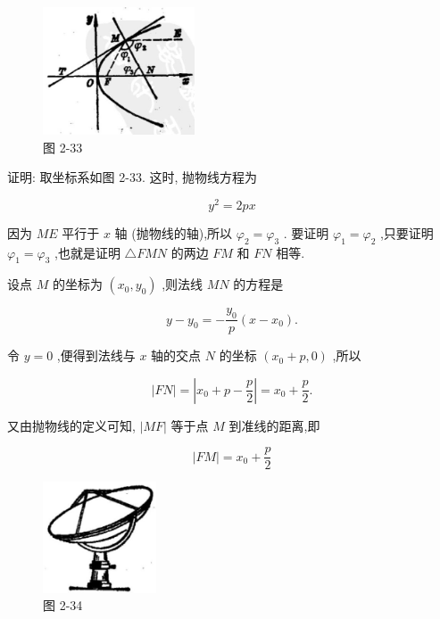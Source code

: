 \documentclass[lang=cn,newtx,10pt,scheme=chinese]{elegantbook}
\begin{document}
\begin{figure}[h]
  \centering
  \includegraphics[max width=0.4\textwidth]{images/01912cc2-ffb6-728e-9ae7-b113ff05c64b_122_544824.jpg}
  \caption{图 2-33}
\end{figure}



证明: 取坐标系如图 2-33. 这时, 抛物线方程为

\[
    {y}^{2} = {2px}
\]

因为 \({ME}\) 平行于 \(x\) 轴 (抛物线的轴),所以 \({\varphi }_{2} = {\varphi }_{3}\) . 要证明 \({\varphi }_{1} = {\varphi }_{2}\) ,只要证明 \({\varphi }_{1} = {\varphi }_{3}\) ,也就是证明 \(\bigtriangleup {FMN}\) 的两边 \({FM}\) 和 \({FN}\) 相等.

设点 \(M\) 的坐标为 \(\left( {{x}_{0},{y}_{0}}\right)\) ,则法线 \({MN}\) 的方程是

\[
  y - {y}_{0} = - \frac{{y}_{0}}{p}\left( {x - {x}_{0}}\right) .
\]

令 \(y = 0\) ,便得到法线与 \(x\) 轴的交点 \(N\) 的坐标 \(\left( {{x}_{0} + p,0}\right)\) ,所以

\[
  \left| {FN}\right| = \left| {{x}_{0} + p - \frac{p}{2}}\right| = {x}_{0} + \frac{p}{2}.
\]

又由抛物线的定义可知, \(\left| {MF}\right|\) 等于点 \(M\) 到准线的距离,即

\[
  \left| {FM}\right| = {x}_{0} + \frac{p}{2}
\]

\begin{figure}[h]
  \centering
  \includegraphics[max width=0.3\textwidth]{images/01912cc2-ffb6-728e-9ae7-b113ff05c64b_123_742628.jpg}
  \caption{图 2-34}
\end{figure}
\end{document}
